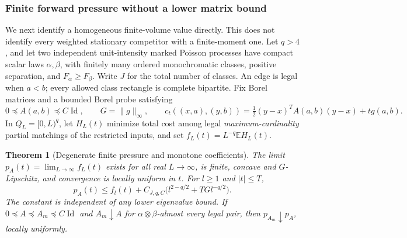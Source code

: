 \documentclass[11pt,reqno]{amsart}
\newtheorem{theorem}{Theorem}[section]
\theoremstyle{definition}
\theoremstyle{remark}
\numberwithin{equation}{section}
\newcommand{\E}{\mathbb E}
\begin{document}
\subsubsection{Finite forward pressure without a lower matrix bound}
\label{degenerate-finite-section}

We next identify a homogeneous finite-volume value directly. This does
not identify every weighted stationary competitor with a finite-moment
one. Let \(q>4\), and let two independent unit-intensity marked Poisson
processes have compact scalar laws \(\alpha,\beta\), with finitely many
ordered monochromatic classes, positive separation, and
\(F_\alpha\ge F_\beta\). Write \(J\) for the total number of classes.
An edge is legal when \(a<b\); every allowed class rectangle is complete
bipartite. Fix Borel matrices and a bounded Borel probe satisfying
\[
 0\preceq A(a,b)\preceq C\operatorname{Id},\qquad
 G=\|g\|_\infty,\qquad
 c_t((x,a),(y,b))=\tfrac12(y-x)^TA(a,b)(y-x)+tg(a,b).
\]
In \(Q_L=[0,L)^q\), let \(H_L(t)\) minimize total cost among legal
\emph{maximum-cardinality} partial matchings of the restricted inputs,
and set \(f_L(t)=L^{-q}\E H_L(t)\).

\begin{theorem}[Degenerate finite pressure and monotone coefficients]
\label{degenerate-finite-pressure}
The limit \(p_A(t)=\lim_{L\to\infty}f_L(t)\) exists for all real
\(L\to\infty\), is finite, concave and \(G\)-Lipschitz, and convergence
is locally uniform in \(t\). For \(l\ge1\) and \(|t|\le T\),
\begin{equation}
\label{degenerate-finite-size}
 p_A(t)\le f_l(t)+C_{J,q,C}
       \bigl(l^{2-q/2}+TG l^{-q/2}\bigr).
\end{equation}
The constant is independent of any lower eigenvalue bound. If
\(0\preceq A\preceq A_m\preceq C\operatorname{Id}\) and
\(A_m\downarrow A\) for \(\alpha\otimes\beta\)-almost every legal
pair, then \(p_{A_m}\downarrow p_A\), locally uniformly.
\end{theorem}
\end{document}
